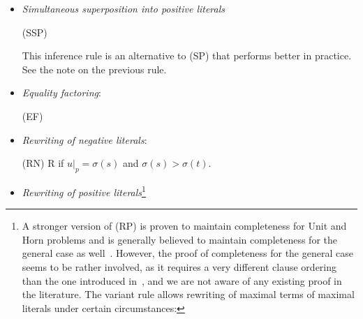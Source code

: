 \documentclass{report}
\begin{document}
\begin{definition}
\begin{itemize}
   This inference rule is an alternative to (SN). Note that the
   difference is that \emph{every} occurrence of the subterm unified
   with the left-hand side of the rewriting clause is replaced by (the
   instance of) the right-hand side in (the instance of) the clause
   that is rewritten. This single rule usually performs better than a
   sequence of conventional superpositions in practice.

\item \emph{Simultaneous superposition into positive literals}

  \bigskip (SSP) 

  This inference rule is an alternative to (SP) that performs better
  in practice. See the note on the previous rule.

 \item \emph{Equality factoring}:

   \bigskip (EF) 


 \item \emph{Rewriting of negative literals}:

   \bigskip (RN)  {
     \phantom{ae}  \vee R} {if
     $u|_p = \sigma(s)$ and $\sigma(s)>\sigma(t)$.}


 \item \emph{Rewriting of positive
     literals}\footnote{A stronger version of (RP)
     is proven to maintain completeness for Unit and Horn problems
     and is generally believed to maintain completeness for the
     general case as well~\cite{Bachmair:personal-98}.  However, the
     proof of completeness for the general case seems to be rather
     involved, as it requires a very different clause ordering than
     the one introduced in~\cite{BG94}, and we are not aware of any
     existing proof in the literature. The variant rule allows
     rewriting of maximal terms of maximal literals under certain
     circumstances:

}
\end{itemize}
\end{definition}
\end{document}
